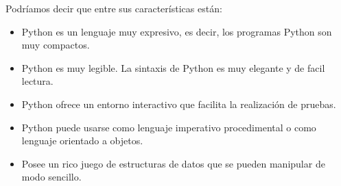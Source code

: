 Podríamos decir que entre sus características \citep[pág 15]{marzal2004introduccion} están: 

\begin{itemize}
  \item Python es un lenguaje muy expresivo, es decir, los programas Python son muy compactos.
  \item Python es muy legible. La sintaxis de Python es muy elegante y de facil lectura.
  \item Python ofrece un entorno interactivo que facilita la realización de pruebas.
  \item Python puede usarse como lenguaje imperativo procedimental o como lenguaje orientado a objetos.
  \item Posee un rico juego de estructuras de datos que se pueden manipular de modo sencillo.
 
\end{itemize}




